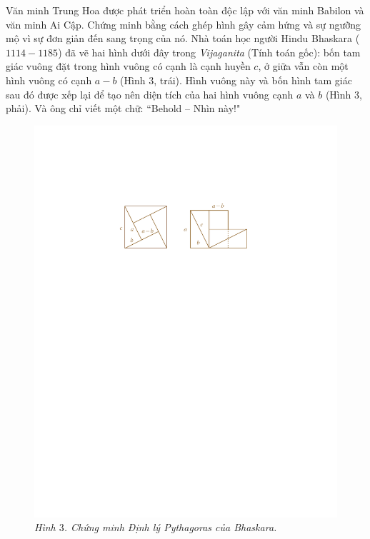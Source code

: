 \begin{multicols}{2}
\begin{figure}[H]
		\vspace*{-10pt}
	\end{figure}
	Văn minh Trung Hoa được phát triển hoàn toàn độc lập với văn minh Babilon và văn minh Ai Cập. 
	\vskip 0.1cm
	Chứng minh bằng cách ghép hình gây cảm hứng và sự ngưỡng mộ vì sự đơn giản đến sang trọng của nó. Nhà toán học người Hindu Bhaskara ($1114-1185$) đã vẽ hai hình dưới đây trong \textit{Vijaganita} (Tính toán gốc): bốn tam giác vuông đặt trong hình vuông có cạnh là cạnh huyền $c$, ở giữa vẫn còn một hình vuông có cạnh $a-b$ (Hình $3$, trái). Hình vuông này và bốn hình tam giác sau đó được xếp lại để tạo nên diện tích của hai hình vuông cạnh $a$ và $b$  (Hình $3$, phải). Và ông chỉ viết một chữ: ``Behold -- Nhìn này!"
	\begin{figure}[H]
		\vspace*{-5pt}
		\centering
		\captionsetup{labelformat= empty, justification=centering}
		\includegraphics[width= 1\linewidth]{15}
		\caption{\small\textit{\color{lichsutoanhoc}Hình $3$. Chứng minh Định lý Pythagoras của Bhaskara.}}

\end{figure}
\end{multicols}
